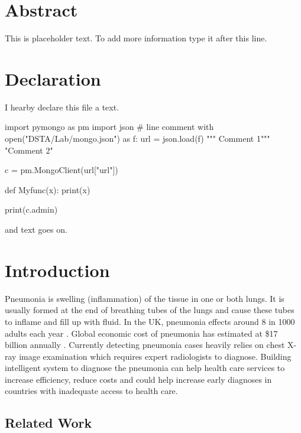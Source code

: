 \documentclass[12pt, twoside, a4paper]{article}
\begin{document}
\section*{Abstract}
This is placeholder text. To add more information type it after this line.\\
\clearpage


\section*{Declaration}
I hearby declare this file a text.

\begin{python}
    import pymongo as pm
    import json
    # line comment
    with open("DSTA/Lab/mongo.json") as f:
    url = json.load(f)
    """ Comment 1"""
    "Comment 2"

    c = pm.MongoClient(url["url"])

    def Myfunc(x):
        print(x)

    print(c.admin)
\end{python}
and text goes on.\\
\clearpage

\tableofcontents
\thispagestyle{empty}
\cleardoublepage
    

\setcounter{page}{1}


\section{Introduction}

Pneumonia is swelling (inflammation) of the tissue in one or both lungs. It is usually formed at the end of breathing tubes of the lungs and cause these tubes to inflame and fill up with fluid. In the UK, pneumonia effects around 8 in 1000 adults each year \cite{nhs}. Global economic cost of pneumonia has estimated at \$17 billion annually \cite{cost}. Currently detecting pneumonia cases heavily relies on chest X-ray image examination which requires expert radiologists to diagnose. Building intelligent system to diagnose the pneumonia can help  health care services to increase efficiency, reduce costs and could help increase early diagnoses in countries with inadequate access to health care.

\subsection{Related Work}
\end{document}
